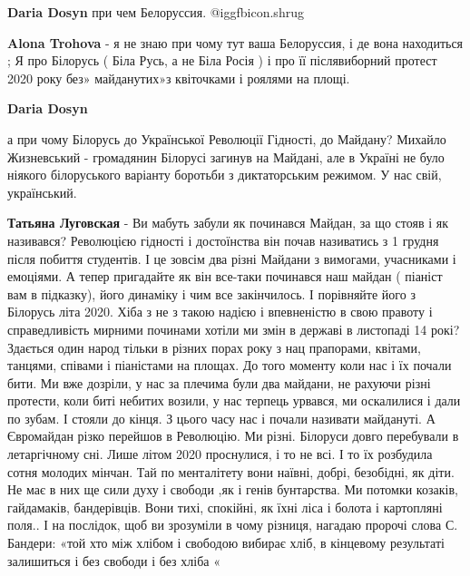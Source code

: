 \begin{itemize} %
\textbf{Daria Dosyn} при чем Белоруссия. @igg{fbicon.shrug} 

\textbf{Alona Trohova} - я не знаю при чому тут ваша Белоруссия, і де вона находиться ; Я про Білорусь ( Біла Русь, а не Біла Росія ) і про її післявиборний протест 2020 року без» майданутих»з квіточками і роялями на площі.

\textbf{Daria Dosyn} 

а при чому Білорусь до Української Революції Гідності, до Майдану? Михайло
Жизневський - громадянин Білорусі загинув на Майдані, але в Україні не було
ніякого білоруського варіанту боротьби з диктаторським режимом. У нас свій,
український.

\textbf{Татьяна Луговская} - Ви мабуть забули як починався Майдан, за що стояв
і як називався? Революцією гідності і достоїнства він почав називатись з 1
грудня після побиття студентів. І це зовсім два різні Майдани з вимогами,
учасниками і емоціями. А тепер пригадайте як він все-таки починався наш майдан
( піаніст вам в підказку), його динаміку і чим все закінчилось. І порівняйте
його з Білорусь літа 2020. Хіба з не з такою надією і впевненістю в свою
правоту і справедливість мирними починами хотіли ми змін в державі в листопаді
14 рокі? Здається один народ тільки в різних порах року з нац прапорами,
квітами, танцями, співами і піаністами на площах. До того моменту коли нас і їх
почали бити. Ми вже дозріли, у нас за плечима були два майдани, не рахуючи
різні протести, коли биті небитих возили, у нас терпець урвався, ми оскалилися
і дали по зубам. І стояли до кінця. З цього часу нас і почали називати
майдануті. А Євромайдан різко перейшов в Революцію. Ми різні. Білоруси довго
перебували в летаргічному сні. Лише літом 2020 проснулися, і то не всі. І то їх
розбудила сотня молодих мінчан. Тай по менталітету вони наївні, добрі,
безобідні, як діти. Не має в них ще сили духу і свободи ,як і генів бунтарства.
Ми потомки козаків, гайдамаків, бандерівців. Вони тихі, спокійні, як їхні ліса
і болота і картопляні поля.. І на послідок, щоб ви зрозуміли в чому різниця,
нагадаю пророчі слова С. Бандери: «той хто між хлібом і свободою вибирає хліб, в
кінцевому результаті залишиться і без свободи і без хліба « 

\end{itemize} %


